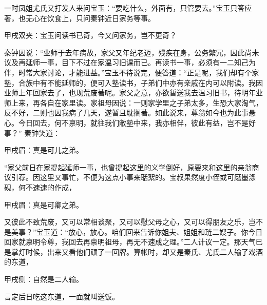 \begin{parag}
    一时凤姐尤氏又打发人来问宝玉：“要吃什么，外面有，只管要去。”宝玉只答应著，也无心在饮食上，只问秦钟近日家务等事。\begin{note}甲戌双夹：宝玉问读书已奇，今又问家务，岂不更奇？\end{note}秦钟因说：“业师于去年病故，家父又年纪老迈，残疾在身，公务繁冗，因此尚未议及再延师一事，目下不过在家温习旧课而已。再读书一事，必须有一二知己为伴，时常大家讨论，才能进益。”宝玉不待说完，便答道：“正是呢，我们却有个家塾，合族中有不能延师的，便可入塾读书，子弟们中亦有亲戚在内可以附读。我因业师上年回家去了，也现荒废著呢。家父之意，亦欲暂送我去温习旧书，待明年业师上来，再各自在家里读。家祖母因说：一则家学里之子弟太多，生恐大家淘气，反不好，二则也因我病了几天，遂暂且耽搁著。如此说来，尊翁如今也为此事悬心。今日回去，何不禀明，就往我们敝塾中来，我亦相伴，彼此有益，岂不是好事？” 秦钟笑道：\begin{note}甲戌眉：真是可儿之弟。\end{note}“家父前日在家提起延师一事，也曾提起这里的义学倒好，原要来和这里的亲翁商议引荐。因这里又事忙，不便为这点小事来聒絮的。宝叔果然度小侄或可磨墨涤砚，何不速速的作成，\begin{note}甲戌眉：真是可卿之弟。\end{note}又彼此不致荒废，又可以常相谈聚，又可以慰父母之心，又可以得朋友之乐，岂不是美事？”宝玉道：“放心，放心。咱们回来告诉你姐夫、姐姐和琏二嫂子。你今日回家就禀明令尊，我回去再禀明祖母，再无不速成之理。”二人计议一定。那天气已是掌灯时候，出来又看他们顽了一回牌。算帐时，却又是秦氏、尤氏二人输了戏酒的东道，\begin{note}甲戌侧：自然是二人输。\end{note}言定后日吃这东道，一面就叫送饭。
\end{parag}


